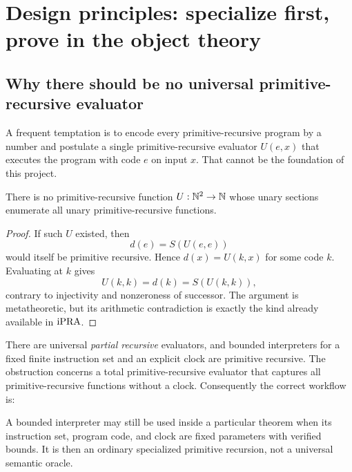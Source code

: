 
\section{Design principles: specialize first, prove in the object theory}
\label{sec:design}

\subsection{Why there should be no universal primitive-recursive evaluator}

A frequent temptation is to encode every primitive-recursive program by a
number and postulate a single primitive-recursive evaluator
\(U(e,x)\) that executes the program with code \(e\) on input \(x\).  That
cannot be the foundation of this project.

\begin{proposition}
There is no primitive-recursive function \(U:\mathbb{N}^2\to\mathbb{N}\) whose unary
sections enumerate all unary primitive-recursive functions.
\end{proposition}

\begin{proof}
If such \(U\) existed, then
\[
     d(e)=S(U(e,e))
\]
would itself be primitive recursive.  Hence \(d(x)=U(k,x)\) for some code
\(k\).  Evaluating at \(k\) gives
\[
     U(k,k)=d(k)=S(U(k,k)),
\]
contrary to injectivity and nonzeroness of successor.  The argument is
metatheoretic, but its arithmetic contradiction is exactly the kind already
available in \(\mathrm{iPRA}\).
\end{proof}

There are universal \emph{partial recursive} evaluators, and bounded
interpreters for a fixed finite instruction set and an explicit clock are
primitive recursive.  The obstruction concerns a total primitive-recursive
evaluator that captures all primitive-recursive functions without a clock.
Consequently the correct workflow is:

\begin{center}
\end{center}

A bounded interpreter may still be used inside a particular theorem when its
instruction set, program code, and clock are fixed parameters with verified
bounds.  It is then an ordinary specialized primitive recursion, not a
universal semantic oracle.

